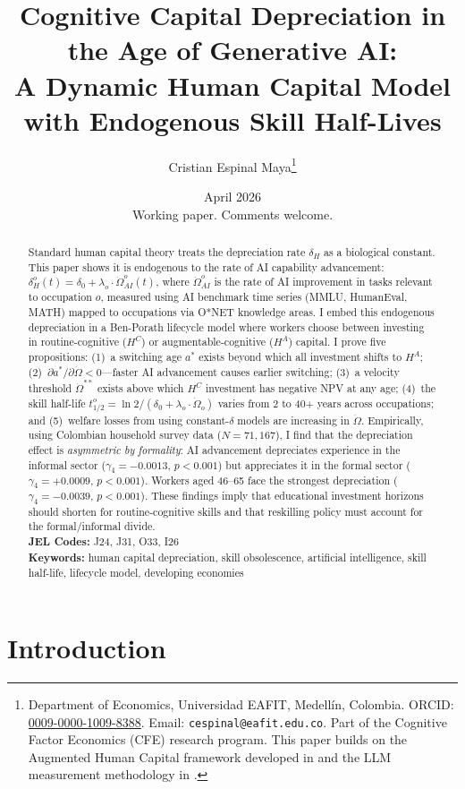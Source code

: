 \documentclass[11pt,a4paper]{article}
\title{\textbf{Cognitive Capital Depreciation in the Age of Generative AI:}\\[4pt]
A Dynamic Human Capital Model with Endogenous Skill Half-Lives}
\author{Cristian Espinal Maya\thanks{Department of Economics, Universidad EAFIT, Medell\'in, Colombia. ORCID: \href{https://orcid.org/0009-0000-1009-8388}{0009-0000-1009-8388}. Email: \texttt{cespinal@eafit.edu.co}. Part of the Cognitive Factor Economics (CFE) research program. This paper builds on the Augmented Human Capital framework developed in \citet{espinal2026ahc} and the LLM measurement methodology in \citet{espinal2026llm}.}}
\date{April 2026\\[6pt]{\small Working paper. Comments welcome.}}
\theoremstyle{definition}
\begin{document}
\maketitle

\begin{abstract}
\noindent
Standard human capital theory treats the depreciation rate $\delta_H$ as a biological constant. This paper shows it is endogenous to the rate of AI capability advancement: $\delta_H^o(t) = \delta_0 + \lambda_o \cdot \dot{\Omega}_{AI}^o(t)$, where $\dot{\Omega}_{AI}^o$ is the rate of AI improvement in tasks relevant to occupation $o$, measured using AI benchmark time series (MMLU, HumanEval, MATH) mapped to occupations via O*NET knowledge areas. I embed this endogenous depreciation in a Ben-Porath lifecycle model where workers choose between investing in routine-cognitive ($H^C$) or augmentable-cognitive ($H^A$) capital. I prove five propositions: (1)~a switching age $a^*$ exists beyond which all investment shifts to $H^A$; (2)~$\partial a^*/\partial \dot{\Omega} < 0$---faster AI advancement causes earlier switching; (3)~a velocity threshold $\dot{\Omega}^{**}$ exists above which $H^C$ investment has negative NPV at any age; (4)~the skill half-life $t_{1/2}^o = \ln 2 / (\delta_0 + \lambda_o \cdot \dot{\Omega}_o)$ varies from 2 to 40+ years across occupations; and (5)~welfare losses from using constant-$\delta$ models are increasing in $\dot{\Omega}$. Empirically, using Colombian household survey data ($N = 71{,}167$), I find that the depreciation effect is \textit{asymmetric by formality}: AI advancement depreciates experience in the informal sector ($\gamma_4 = -0.0013$, $p < 0.001$) but appreciates it in the formal sector ($\gamma_4 = +0.0009$, $p < 0.001$). Workers aged 46--65 face the strongest depreciation ($\gamma_4 = -0.0039$, $p < 0.001$). These findings imply that educational investment horizons should shorten for routine-cognitive skills and that reskilling policy must account for the formal/informal divide.\\[6pt]
\noindent\textbf{JEL Codes:} J24, J31, O33, I26\\[3pt]
\noindent\textbf{Keywords:} human capital depreciation, skill obsolescence, artificial intelligence, skill half-life, lifecycle model, developing economies
\end{abstract}

\newpage
\tableofcontents
\newpage


\section{Introduction}
\label{sec:intro}
\end{document}
